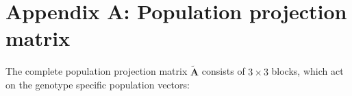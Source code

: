 \documentclass[11pt,draft]{article}
\def\mbf#1{\mathbf{#1}}
\begin{document}
\newpage{}




%
%
%
%
%

\section*{Appendix A: Population projection matrix}
\renewcommand{\theequation}{A\arabic{equation}}
\setcounter{equation}{0}  %
\setcounter{table}{0}  %

The complete population projection matrix $\tilde{\mbf{A}}$ consists of $3 \times 3$ blocks, which act on the genotype specific population vectors:
\end{document}
